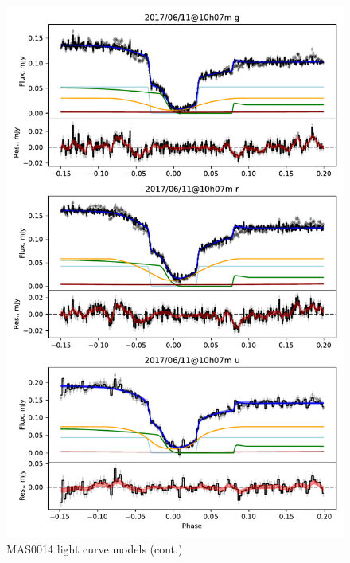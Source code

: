 \begin{figure}
    \centering
    \includegraphics[width=\textwidth]{figures/results/MASOT0014/MASOT0014_2.pdf}
    \caption{MAS0014 light curve models (cont.)}
    \label{fig:MAS0014 all light curves cont 1}
\end{figure}

